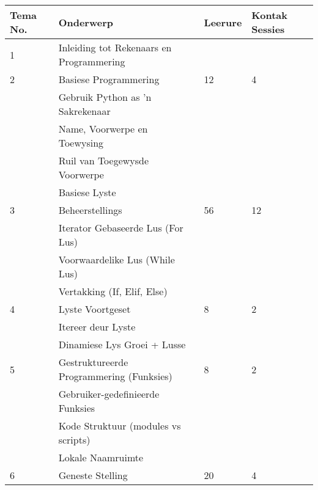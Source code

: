        \begin{table}[!h]
             \begin{tabular}{|p{1.4cm}|l|p{2cm}|p{2cm}|}
                 \hline
                 {\bf Tema No.} & {\bf Onderwerp} & 
                    {\bf Leerure} & {\bf Kontak Sessies} \\
                 \hline
                 1  & Inleiding tot Rekenaars en Programmering &    &   \\
                 \hline
                 2  & Basiese Programmering                     & 12 & 4 \\
                    & \qquad Gebruik Python as 'n Sakrekenaar   &    &   \\
                    & \qquad Name, Voorwerpe en Toewysing     &    &   \\
                    & \qquad Ruil van Toegewysde Voorwerpe                    &    &   \\
                    & \qquad Basiese Lyste                    &    &   \\
                 \hline
                 3  & Beheerstellings                          & 56 & 12 \\
                    & \qquad Iterator Gebaseerde Lus  (For Lus)                        &    &   \\
                    & \qquad Voorwaardelike Lus  (While Lus)                        &    &   \\
                    & \qquad Vertakking (If, Elif, Else)        &    &   \\                 
                 \hline
                 4  & Lyste Voortgeset                             & 8 & 2 \\
                    & \qquad Itereer deur Lyste    &    &   \\
                    & \qquad Dinamiese Lys Groei + Lusse               &    &   \\                 
                 \hline
                 5  & Gestruktureerde Programmering (Funksies)              & 8 & 2 \\
                    & \qquad Gebruiker-gedefinieerde Funksies   &    &   \\                 
                    & \qquad Kode Struktuur  (modules vs scripts)                    &    &   \\
                    & \qquad Lokale Naamruimte               &    &   \\
                 \hline
                 6  & Geneste Stelling                     & 20 & 4 \\

\end{tabular}
\end{table}
